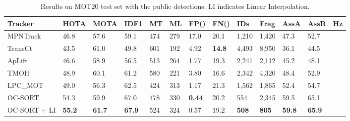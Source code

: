 \documentclass[10pt,twocolumn,letterpaper]{article}
\begin{document}
\begin{table*}[t]
\centering
\caption{Results on MOT20 test set with the public detections. LI indicates Linear Interpolation.}
\setlength{\tabcolsep}{7pt}
\scriptsize
\begin{tabular}{ l | p{20px}p{20px}p{20px}HHp{27px} p{27px}p{22px}p{22px}p{20px}p{20px} H}

\toprule
Tracker & HOTA & MOTA & IDF1  & MT & ML& FP({\footnotesize }) & FN({\footnotesize }) & IDs & Frag & AssA & AssR & Hz\\
\midrule
MPNTrack~\cite{mpntrack} & 46.8 & 57.6 & 59.1  & 474 & 279 & 17.0 & 20.1 & 1,210 & 1,420 & 47.3 & 52.7\\
TransCt~\cite{transcenter}  & 43.5 & 61.0 & 49.8 & 601 & 192 & 4.92 & \textbf{14.8} & 4,493 & 8,950 & 36.1 & 44.5\\
ApLift~\cite{aplift} & 46.6 & 58.9 & 56.5  & 513 & 264 & 1.77 & 19.3 & 2,241 & 2,112 & 45.2 & 48.1\\
TMOH~\cite{tmoh} & 48.9 & 60.1 & 61.2  & 580 & 221 & 3.80 & 16.6 & 2,342 & 4,320 & 48.4 & 52.9\\ 
LPC\_MOT~\cite{lpc_mot} & 49.0 & 56.3 & 62.5  & 424 & 313 & 1.17 & 21.3 & 1,562 & 1,865 & 52.4 & 54.7\\
\midrule
OC-SORT & 54.3 & 59.9 & 67.0  & 478 & 330 & \textbf{0.44} & 20.2 & 554 & 2,345 & 59.5 & 65.1 \\
OC-SORT + LI & \textbf{55.2} &  \textbf{61.7} & \textbf{67.9}  & 524 & 324 & 0.57 & 19.2 & \textbf{508} & \textbf{805} & \textbf{59.8} & \textbf{65.9}\\
\bottomrule
\end{tabular}
\label{table:mot20_public}
\vspace{-0.2cm}
\end{table*}
\end{document}
